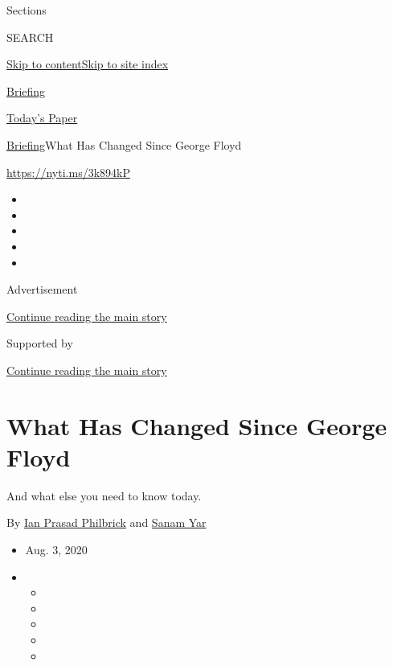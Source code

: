 Sections

SEARCH

\protect\hyperlink{site-content}{Skip to
content}\protect\hyperlink{site-index}{Skip to site index}

\href{https://www.nytimes.com/interactive/2018/briefing/global-morning-briefing-newsletter-signup.html}{Briefing}

\href{https://myaccount.nytimes.com/auth/login?response_type=cookie\&client_id=vi}{}

\href{https://www.nytimes.com/section/todayspaper}{Today's Paper}

\href{/interactive/2018/briefing/global-morning-briefing-newsletter-signup.html}{Briefing}\textbar{}What
Has Changed Since George Floyd

\url{https://nyti.ms/3k894kP}

\begin{itemize}
\item
\item
\item
\item
\item
\end{itemize}

Advertisement

\protect\hyperlink{after-top}{Continue reading the main story}

Supported by

\protect\hyperlink{after-sponsor}{Continue reading the main story}

\hypertarget{what-has-changed-since-george-floyd}{%
\section{What Has Changed Since George
Floyd}\label{what-has-changed-since-george-floyd}}

And what else you need to know today.

By \href{https://www.nytimes.com/by/ian-prasad-philbrick}{Ian Prasad
Philbrick} and \href{https://www.nytimes.com/by/sanam-yar}{Sanam Yar}

\begin{itemize}
\item
  Aug. 3, 2020
\item
  \begin{itemize}
  \item
  \item
  \item
  \item
  \item
  \end{itemize}
\end{itemize}

